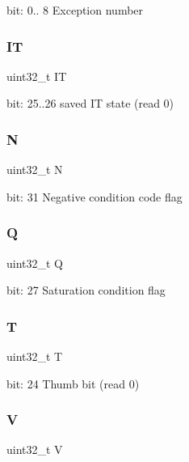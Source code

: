 bit\+: 0.. 8 Exception number \mbox{\label{unionx_p_s_r___type_a76485660fe8ad98cdc71ddd7cb0ed777}} 
\subsubsection{\texorpdfstring{IT}{IT}}
{\footnotesize\ttfamily uint32\+\_\+t IT}

bit\+: 25..26 saved IT state (read 0) \mbox{\label{unionx_p_s_r___type_abae0610bc2a97bbf7f689e953e0b451f}} 
\subsubsection{\texorpdfstring{N}{N}}
{\footnotesize\ttfamily uint32\+\_\+t N}

bit\+: 31 Negative condition code flag \mbox{\label{unionx_p_s_r___type_a65f27ddc4f7e09c14ce7c5211b2e000a}} 
\subsubsection{\texorpdfstring{Q}{Q}}
{\footnotesize\ttfamily uint32\+\_\+t Q}

bit\+: 27 Saturation condition flag \mbox{\label{unionx_p_s_r___type_a6e1cf12e53a20224f6f62c001d9be972}} 
\subsubsection{\texorpdfstring{T}{T}}
{\footnotesize\ttfamily uint32\+\_\+t T}

bit\+: 24 Thumb bit (read 0) \mbox{\label{unionx_p_s_r___type_acd4a2b64faee91e4a9eef300667fa222}} 
\subsubsection{\texorpdfstring{V}{V}}
{\footnotesize\ttfamily uint32\+\_\+t V}

